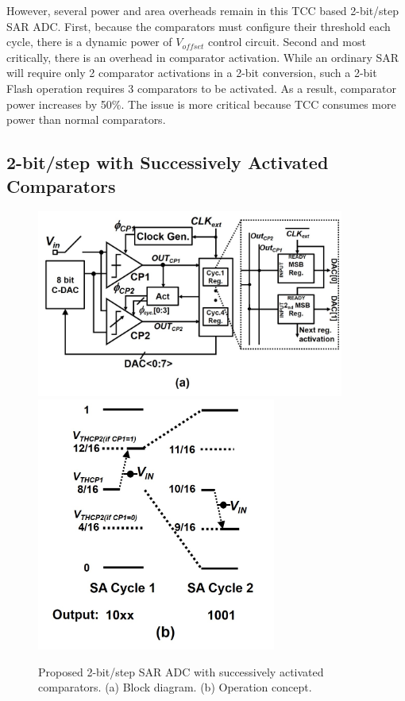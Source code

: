 However, several power and area overheads remain in this TCC based 2-bit/step SAR ADC. First, because the comparators must configure their threshold each cycle, there is a dynamic power of $V_{offset}$ control circuit. Second and most critically, there is an overhead in comparator activation. While an ordinary SAR will require only 2 comparator activations in a 2-bit conversion, such a 2-bit Flash operation requires 3 comparators to be activated. As a result, comparator power increases by 50\%. The issue is more critical because TCC consumes more power than normal comparators.

\subsection{2-bit/step with Successively Activated Comparators}

\begin{figure}
\centering
  \includegraphics[width=0.9\textwidth]{figure/chap4/fig2a.jpg}
  \includegraphics[width=0.7\textwidth]{figure/chap4/fig2b.jpg}
  \caption{Proposed 2-bit/step SAR ADC with successively activated comparators.    (a) Block diagram. (b) Operation concept.}
  \label{fig-4-2}
\end{figure}

